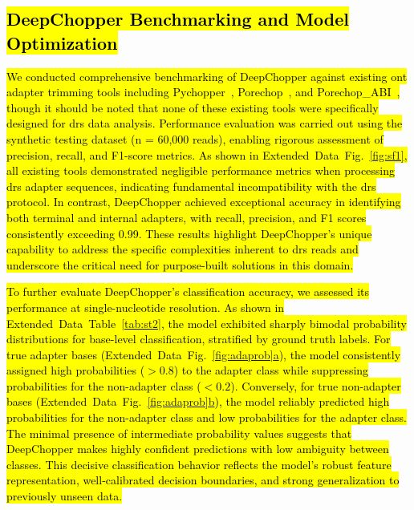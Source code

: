 \documentclass[pdflatex,sn-nature, lineno]{sn-jnl}%
\newcommand{\edfigref}[2]{Extended Data Fig.~\hyperref[#1]{\ref*{#1}#2}}
\newcommand{\edtableref}[2]{Extended Data Table~\hyperref[#1]{\ref*{#1}#2}}
\begin{document}
\subsection{\hl{DeepChopper Benchmarking and Model Optimization}}

\hl{We conducted comprehensive benchmarking of DeepChopper against existing \mbox{\gls{ont}} adapter trimming tools including Pychopper\mbox{~\cite{pychopper}}, Porechop\mbox{~\cite{Wick2017}}, and Porechop\_ABI\mbox{~\cite{bonenfant2023porechop}}, though it should be noted that none of these existing tools were specifically designed for \mbox{\gls{drs}} data analysis.
Performance evaluation was carried out using the synthetic testing dataset (n = 60,000 reads), enabling rigorous assessment of precision, recall, and F1-score metrics.
As shown in \mbox{\edfigref{fig:sf1}{}}, all existing tools demonstrated negligible performance metrics when processing \mbox{\gls{drs}} adapter sequences, indicating fundamental incompatibility with the \mbox{\gls{drs}} protocol.
In contrast, DeepChopper achieved exceptional accuracy in identifying both terminal and internal adapters, with recall, precision, and F1 scores consistently exceeding 0.99.
These results highlight DeepChopper's unique capability to address the specific complexities inherent to \mbox{\gls{drs}} reads and underscore the critical need for purpose-built solutions in this domain.}

\hl{To further evaluate DeepChopper’s classification accuracy, we assessed its performance at single-nucleotide resolution. As shown in \mbox{\edtableref{tab:st2}{}}, the model exhibited sharply bimodal probability distributions for base-level classification, stratified by ground truth labels. For true adapter bases (\mbox{\edfigref{fig:adaprob}{a}}), the model consistently assigned high probabilities ($>0.8$) to the adapter class while suppressing probabilities for the non-adapter class ($<0.2$).
Conversely, for true non-adapter bases (\mbox{\edfigref{fig:adaprob}{b}}), the model reliably predicted high probabilities for the non-adapter class and low probabilities for the adapter class.
The minimal presence of intermediate probability values suggests that DeepChopper makes highly confident predictions with low ambiguity between classes.
This decisive classification behavior reflects the model’s robust feature representation, well-calibrated decision boundaries, and strong generalization to previously unseen data.}
\end{document}
